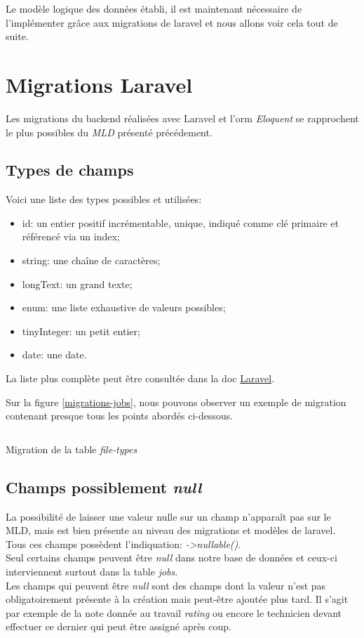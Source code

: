 \documentclass[
    iai, %
    il, %
]{heig-tb}
\begin{document}
Le modèle logique des données établi, il est maintenant nécessaire de l'implémenter grâce aux migrations de \Gls{laravel} et nous allons voir cela tout de suite.

\section{Migrations Laravel}

Les migrations du \Gls{backend} réalisées avec Laravel et l'\Gls{orm} \emph{Eloquent} se rapprochent le plus possibles du \emph{MLD} présenté précédement.

\subsection{Types de champs}
Voici une liste des types possibles et utilisées:
\begin{itemize}
    \item id: un entier positif incrémentable, unique, indiqué comme clé primaire et référencé via un index;
    \item string: une chaîne de caractères;
    \item longText: un grand texte;
    \item enum: une liste exhaustive de valeurs possibles;
    \item tinyInteger: un petit entier;
    \item date: une date.
\end{itemize}

La liste plus complète peut être consultée dans la doc \href{https://laravel.com/docs/9.x/migrations#available-column-types}{Laravel}.

Sur la figure \ref{migrations-jobs}, nous pouvons observer un exemple de migration contenant presque tous les points abordés ci-dessous.

\begin{listing}[ht]
    \inputminted{php}{assets/code/16_create_jobs_table.php}
    \caption{Migration de la table \emph{file-types} \label{migrations-jobs}}
\end{listing}

\subsection{Champs possiblement \emph{null}}
La possibilité de laisser une valeur nulle sur un champ n'apparaît pas sur le MLD, mais est bien présente au niveau des migrations et modèles de \Gls{laravel}.\\
Tous ces champs possèdent l'indiquation: \emph{->nullable()}.\\
Seul certains champs peuvent être \emph{null} dans notre base de données et ceux-ci interviennent surtout dans la table \emph{jobs}.\\
Les champs qui peuvent être \emph{null} sont des champs dont la valeur n'est pas obligatoirement présente à la création mais peut-être ajoutée plus tard. Il s'agit par exemple de la note donnée au travail \emph{rating} ou encore le technicien devant effectuer ce dernier qui peut être assigné après coup.
\end{document}
